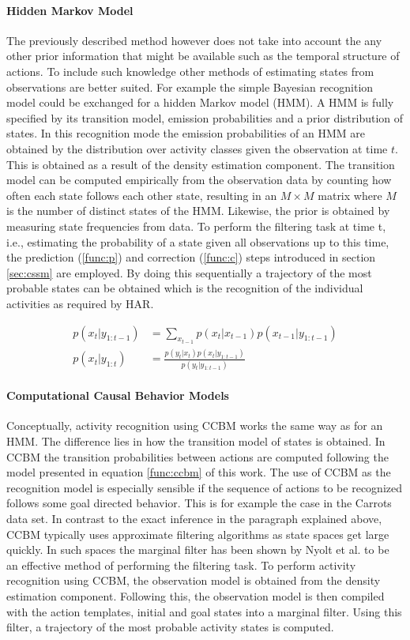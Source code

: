 \documentclass[11pt,titlepage,oneside,openany]{book}
\begin{document}
\paragraph{Hidden Markov Model}
The previously described method however does not take into account the any other prior information that might be available such as the temporal structure of actions. To include such knowledge other methods of estimating states from observations are better suited. For example the simple Bayesian recognition model could be exchanged for a hidden Markov model (HMM). A HMM is fully specified by its transition model, emission probabilities and a prior distribution of states. In this recognition mode the emission probabilities of an HMM are obtained by the distribution over activity classes given the observation at time $t$. This is obtained as a result of the density estimation component. The transition model can be computed empirically from the observation data by counting how often each state follows each other state, resulting in an $M \times M$ matrix where $M$ is the number of distinct states of the HMM. Likewise, the prior is obtained by measuring state frequencies from data. To perform the filtering task at time t, i.e., estimating the probability of a state given all observations up to this time, the prediction (\ref{func:p}) and correction (\ref{func:c}) steps introduced in section \ref{sec:cssm} are employed. By doing this sequentially a trajectory of the most probable states can be obtained which is the recognition of the individual activities as required by HAR.

\begin{align}
	p(x_t|y_{1:t-1}) &= \sum_{x_{t-1}} p(x_t|x_{t-1}) p(x_{t-1}|y_{1:t-1}) \label{func:p} \\
	p(x_t|y_{1:t}) &= \frac{p(y_t|x_t) p(x_t|y_{1:t-1})}{p(y_t|y_{1:t-1})} \label{func:c}
\end{align}

\paragraph{Computational Causal Behavior Models}
Conceptually, activity recognition using CCBM works the same way as for an HMM. The difference lies in how the transition model of states is obtained. In CCBM the transition probabilities between actions are computed following the model presented in equation \ref{func:ccbm} of this work. The use of CCBM as the recognition model is especially sensible if the sequence of actions to be recognized follows some goal directed behavior. This is for example the case in the Carrots data set. In contrast to the exact inference in the paragraph explained above, CCBM typically uses approximate filtering algorithms as state spaces get large quickly. In such spaces the marginal filter has been shown by Nyolt et al. \cite{nyolt_marginal_2015} to be an effective method of performing the filtering task. To perform activity recognition using CCBM, the observation model is obtained from the density estimation component. Following this, the observation model is then compiled with the action templates, initial and goal states into a marginal filter. Using this filter, a trajectory of the most probable activity states is computed.
\end{document}
